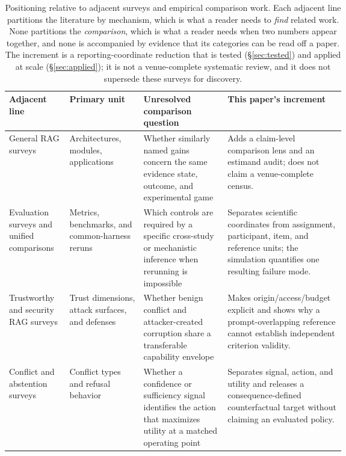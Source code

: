 \begin{table}[t]
\centering
\footnotesize
\renewcommand{\arraystretch}{0.92}
\begin{tabularx}{\linewidth}{>{\raggedright\arraybackslash}p{0.18\linewidth}>{\raggedright\arraybackslash}p{0.22\linewidth}>{\raggedright\arraybackslash}p{0.25\linewidth}X}
\toprule
\textbf{Adjacent line} & \textbf{Primary unit} &
\textbf{Unresolved comparison question} & \textbf{This paper's increment} \\
\midrule
General RAG surveys \citep{ragSurvey2024,ragComprehensive2025} &
Architectures, modules, applications &
Whether similarly named gains concern the same evidence state, outcome, and
experimental game &
Adds a claim-level comparison lens and an estimand audit; does not claim a
venue-complete census. \\
Evaluation surveys and unified comparisons
\citep{ragEvaluationSurvey2024,ragBestPractices2024,
alushiRAGComparison2026} &
Metrics, benchmarks, and common-harness reruns &
Which controls are required by a specific cross-study or mechanistic
inference when rerunning is impossible &
Separates scientific coordinates from assignment, participant, item, and
reference units; the simulation quantifies one resulting failure mode. \\
Trustworthy and security RAG surveys
\citep{trustRAGCompass2024,trustworthyRAGSurvey2025,securityRAGSurvey2026} &
Trust dimensions, attack surfaces, and defenses &
Whether benign conflict and attacker-created corruption share a transferable
capability envelope &
Makes origin/access/budget explicit and shows why a prompt-overlapping
reference cannot establish independent criterion validity. \\
Conflict and abstention surveys
\citep{xuKnowledgeConflicts2024,wenAbstentionSurvey2025} &
Conflict types and refusal behavior &
Whether a confidence or sufficiency signal identifies the action that
maximizes utility at a matched operating point &
Separates signal, action, and utility and releases a consequence-defined
counterfactual target without claiming an evaluated policy. \\
\bottomrule
\end{tabularx}
\caption{Positioning relative to adjacent surveys and empirical comparison
work. Each adjacent line partitions the literature by mechanism, which is what a
reader needs to \emph{find} related work. None partitions the
\emph{comparison}, which is what a reader needs when two numbers appear
together, and none is accompanied by evidence that its categories can be read
off a paper. The increment is a reporting-coordinate reduction that is tested
(\S\ref{sec:tested}) and applied at scale (\S\ref{sec:applied}); it is not a
venue-complete systematic review, and it does not supersede these surveys for
discovery.}
\label{tab:main-prior-work-comparison}
\end{table}
